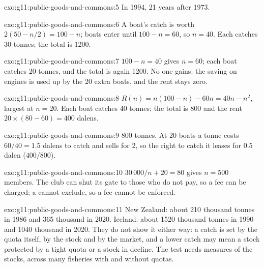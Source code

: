 \begin{solution}{exo:g11:public-goods-and-commons:5}
In 1994, 21 years after 1973.
\end{solution}

\begin{solution}{exo:g11:public-goods-and-commons:6}
A boat's catch is worth $2(50 - n/2) = 100 - n$; boats enter until $100 - n = 60$, so $n = 40$. Each catches 30 tonnes; the total is 1200.
\end{solution}

\begin{solution}{exo:g11:public-goods-and-commons:7}
$100 - n = 40$ gives $n = 60$; each boat catches 20 tonnes, and the total is again 1200. No one gains: the saving on engines is used up by the 20 extra boats, and the
rent stays zero.
\end{solution}

\begin{solution}{exo:g11:public-goods-and-commons:8}
$R(n) = n(100 - n) - 60n = 40n - n^2$, largest at $n = 20$. Each boat catches 40 tonnes; the total is 800 and the rent $20 \times (80 - 60) = 400$ dalens.
\end{solution}

\begin{solution}{exo:g11:public-goods-and-commons:9}
800 tonnes. At 20 boats a tonne costs $60/40 = 1.5$ dalens to catch and sells for 2, so the right to catch it leases for 0.5 dalen ($400/800$).
\end{solution}

\begin{solution}{exo:g11:public-goods-and-commons:10}
$30\,000/n + 20 = 80$ gives $n = 500$ members. The club can shut its gate to those who do not pay, so a fee can be charged; a  cannot exclude, so a fee cannot
be enforced.
\end{solution}

\begin{solution}{exo:g11:public-goods-and-commons:11}
New Zealand: about 210 thousand tonnes in 1986 and 365 thousand in 2020. Iceland: about 1520 thousand tonnes in 1990 and 1040 thousand in 2020. They do not show it either
way: a catch is set by the quota itself, by the stock and by the market, and a lower catch may mean a stock protected by a tight quota or a stock in decline. The test needs
measures of the stocks, across many fisheries with and without quotas.
\end{solution}

